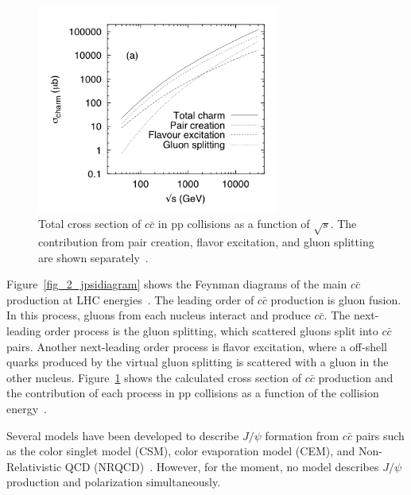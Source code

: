\begin{figure}[!h]
  \centering
  \includegraphics[width=8cm]{chap2/figure/production/ccbar.png}
  \caption{
    Total cross section of $c\bar{c}$ in pp collisions as a function of $\sqrt{s}$.  
    The contribution from pair creation, flavor excitation, and gluon splitting are shown separately~\cite{bib_ccbar}.
  }  
  \label{fig_2_charmxsection}
\end{figure}
Figure~\ref{fig_2_jpsidiagram} shows the Feynman diagrams of the main $c\bar{c}$ production at LHC energies~\cite{bib_ccbar}. 
The leading order of $c\bar{c}$ production is gluon fusion.
In this process, gluons from each nucleus interact and produce $c\bar{c}$. 
The next-leading order process is the gluon splitting, which scattered gluons split into $c\bar{c}$ pairs.
Another next-leading order process is flavor excitation, where a off-shell quarks produced by the virtual gluon splitting is scattered with a gluon in the other nucleus. 
Figure~\ref{fig_2_charmxsection} shows the calculated cross section of $c\bar{c}$ production and the contribution of each process in pp collisions as a function of the collision energy~\cite{bib_ccbar}. 

Several models have been developed to describe $J/\psi$ formation from $c\bar{c}$ pairs such as the color singlet model (CSM), color evaporation model (CEM), and Non-Relativistic QCD (NRQCD)~\cite{bib_csm1,bib_csm2,bib_cem1,bib_cem2}. 
However, for the moment, no model describes $J/\psi$ production and polarization simultaneously. 


